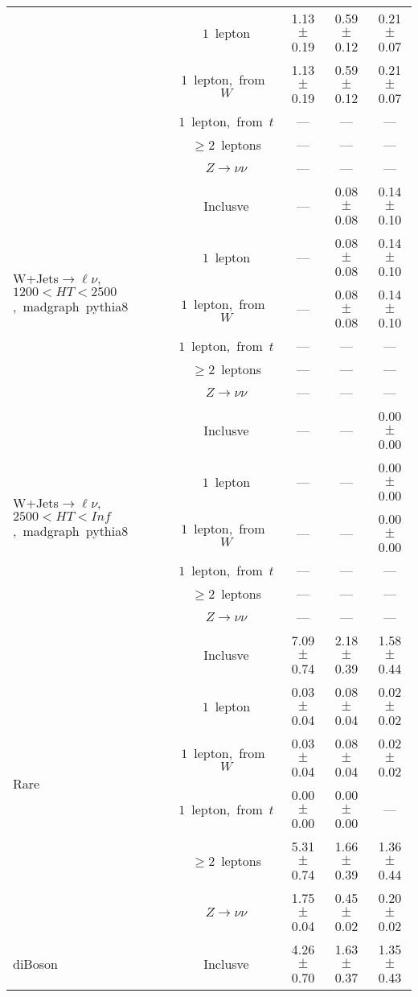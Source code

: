 \documentclass{article}
\begin{document}
\begin{longtable}{|l|c|c|c|c|}
 & $1$~lepton  & 1.13 $\pm$ 0.19  & 0.59 $\pm$ 0.12  & 0.21 $\pm$ 0.07 \\* 
 & $1$~lepton,~from~$W$  & 1.13 $\pm$ 0.19  & 0.59 $\pm$ 0.12  & 0.21 $\pm$ 0.07 \\* 
 & $1$~lepton,~from~$t$  & ---  & ---  & --- \\* 
 & $\ge2$~leptons  & ---  & ---  & --- \\* 
 & $Z\rightarrow\nu\nu$  & ---  & ---  & --- \\* 
\hline 
\multirow{6}{*}{W+Jets$\rightarrow\ell\nu$,~$1200<HT<2500$,~madgraph~pythia8} & Inclusve  & ---  & 0.08 $\pm$ 0.08  & 0.14 $\pm$ 0.10 \\* 
 & $1$~lepton  & ---  & 0.08 $\pm$ 0.08  & 0.14 $\pm$ 0.10 \\* 
 & $1$~lepton,~from~$W$  & ---  & 0.08 $\pm$ 0.08  & 0.14 $\pm$ 0.10 \\* 
 & $1$~lepton,~from~$t$  & ---  & ---  & --- \\* 
 & $\ge2$~leptons  & ---  & ---  & --- \\* 
 & $Z\rightarrow\nu\nu$  & ---  & ---  & --- \\* 
\hline 
\multirow{6}{*}{W+Jets$\rightarrow\ell\nu$,~$2500<HT<Inf$,~madgraph~pythia8} & Inclusve  & ---  & ---  & 0.00 $\pm$ 0.00 \\* 
 & $1$~lepton  & ---  & ---  & 0.00 $\pm$ 0.00 \\* 
 & $1$~lepton,~from~$W$  & ---  & ---  & 0.00 $\pm$ 0.00 \\* 
 & $1$~lepton,~from~$t$  & ---  & ---  & --- \\* 
 & $\ge2$~leptons  & ---  & ---  & --- \\* 
 & $Z\rightarrow\nu\nu$  & ---  & ---  & --- \\* 
\hline 
\multirow{6}{*}{Rare} & Inclusve  & 7.09 $\pm$ 0.74  & 2.18 $\pm$ 0.39  & 1.58 $\pm$ 0.44 \\* 
 & $1$~lepton  & 0.03 $\pm$ 0.04  & 0.08 $\pm$ 0.04  & 0.02 $\pm$ 0.02 \\* 
 & $1$~lepton,~from~$W$  & 0.03 $\pm$ 0.04  & 0.08 $\pm$ 0.04  & 0.02 $\pm$ 0.02 \\* 
 & $1$~lepton,~from~$t$  & 0.00 $\pm$ 0.00  & 0.00 $\pm$ 0.00  & --- \\* 
 & $\ge2$~leptons  & 5.31 $\pm$ 0.74  & 1.66 $\pm$ 0.39  & 1.36 $\pm$ 0.44 \\* 
 & $Z\rightarrow\nu\nu$  & 1.75 $\pm$ 0.04  & 0.45 $\pm$ 0.02  & 0.20 $\pm$ 0.02 \\* 
\hline 
\multirow{6}{*}{diBoson} & Inclusve  & 4.26 $\pm$ 0.70  & 1.63 $\pm$ 0.37  & 1.35 $\pm$ 0.43 \\* 

\end{longtable}
\end{document}
